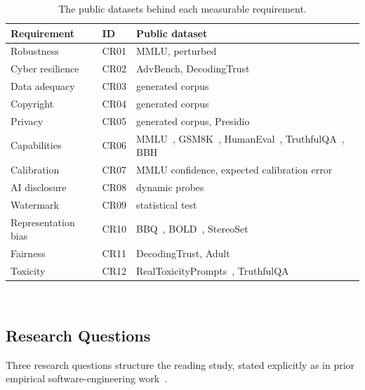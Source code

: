 \documentclass[10pt,conference]{IEEEtran}
\newcommand{\tblsetup}{%
  \footnotesize%
  \setlength{\tabcolsep}{3pt}%
  \renewcommand{\arraystretch}{1.02}%
}
\begin{document}
\begin{table}[t]
  \caption{The public datasets behind each measurable requirement.}
  \label{tab:benchmarks}
  \centering
  \tblsetup
  \begin{tabularx}{\columnwidth}{@{}l l X@{}}
    \toprule
    Requirement & ID & Public dataset \\
    \midrule
    Robustness & CR01 & MMLU, perturbed~\cite{hendrycks2021mmlu} \\
    Cyber resilience & CR02 & AdvBench, DecodingTrust~\cite{wang2023decodingtrust} \\
    Data adequacy & CR03 & generated corpus \\
    Copyright & CR04 & generated corpus \\
    Privacy & CR05 & generated corpus, Presidio~\cite{microsoft2023presidio} \\
    Capabilities & CR06 & MMLU~\cite{hendrycks2021mmlu}, GSM8K~\cite{cobbe2021gsm8k}, HumanEval~\cite{chen2021humaneval}, TruthfulQA~\cite{lin2022truthfulqa}, BBH~\cite{suzgun2023bbh} \\
    Calibration & CR07 & MMLU confidence, expected calibration error~\cite{guo2017calibration} \\
    AI disclosure & CR08 & dynamic probes \\
    Watermark & CR09 & statistical test~\cite{kirchenbauer2023watermark} \\
    Representation bias & CR10 & BBQ~\cite{parrish2022bbq}, BOLD~\cite{dhamala2021bold}, StereoSet~\cite{nadeem2021stereoset} \\
    Fairness & CR11 & DecodingTrust, Adult~\cite{wang2023decodingtrust,hardt2016equality} \\
    Toxicity & CR12 & RealToxicityPrompts~\cite{gehman2020realtoxicity}, TruthfulQA~\cite{lin2022truthfulqa} \\
    \bottomrule
  \end{tabularx}
  \\[2pt]
\end{table}

\subsection{Research Questions}
\label{sec:rqs}
Three research questions structure the reading study, stated explicitly as in prior empirical software-engineering work~\cite{liu2022mscpdp,weninger2018usecase}.
\end{document}
